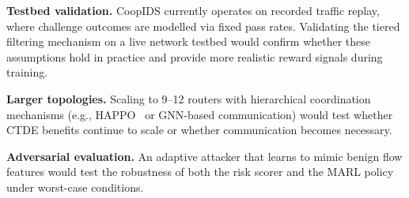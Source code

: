 \documentclass[sigconf,nonacm]{acmart}
\begin{document}
\textbf{Testbed validation.} CoopIDS currently operates on recorded traffic replay, where challenge outcomes are modelled via fixed pass rates. Validating the tiered filtering mechanism on a live network testbed would confirm whether these assumptions hold in practice and provide more realistic reward signals during training.

\textbf{Larger topologies.} Scaling to 9--12 routers with hierarchical coordination mechanisms (e.g., HAPPO~\cite{kuba2022trust} or GNN-based communication) would test whether CTDE benefits continue to scale or whether communication becomes necessary.

\textbf{Adversarial evaluation.} An adaptive attacker that learns to mimic benign flow features would test the robustness of both the risk scorer and the MARL policy under worst-case conditions.



\end{document}
